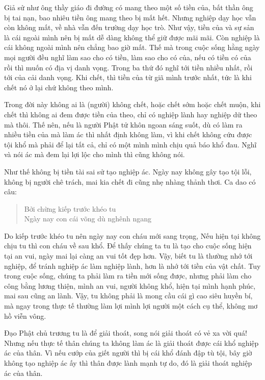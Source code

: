 \documentclass[
  12pt,
  oneside]{book}
\begin{document}
Giả sử như ông thầy giáo đi đường có mang theo một số tiền của, bất thần ông bị tai nạn, bao nhiêu tiền ông mang theo bị mất hết. Nhưng nghiệp dạy học vẫn còn không mất, về nhà vẫn đến trường dạy học trò. Như vậy, tiền của và sự sản là cái ngoài mình nên bị mất dễ dàng không thể giữ được mãi mãi. Còn nghiệp là cái không ngoài mình nên chẳng bao giờ mất. Thế mà trong cuộc sống hằng ngày mọi người đều nghĩ làm sao cho có tiền, làm sao cho có của, nếu có tiền có của rồi thì muốn có địa vị danh vọng. Trong ba thứ đó nghĩ tới tiền nhiều nhất, rồi tới của cải danh vọng. Khi chết, thì tiền của từ giã mình trước nhất, tức là khi chết nó ở lại chứ không theo mình.

Trong đời này không ai là (người) không chết, hoặc chết sớm hoặc chết muộn, khi chết thì không ai đem được tiền của theo, chỉ có nghiệp lành hay nghiệp dữ theo mà thôi. Thế nên, nếu là người Phật tử khôn ngoan sáng suốt, dù có làm ra nhiều tiền của mà làm ác thì nhất định không làm, vì khi chết không cứu được tội khổ mà phải để lại tất cả, chỉ có một mình mình chịu quả báo khổ đau. Nghĩ và nói ác mà đem lại lợi lộc cho mình thì cũng không nói.

Như thế không bị tiền tài sai sử tạo nghiệp ác. Ngày nay không gây tạo tội lỗi, không bị người chê trách, mai kia chết đi cũng nhẹ nhàng thảnh thơi. Ca dao có câu:

\begin{quote}
Bởi chừng kiếp trước khéo tu\\
Ngày nay con cái võng dù nghênh ngang
\end{quote}

Do kiếp trước khéo tu nên ngày nay con cháu mới sang trọng, Nếu hiện tại không chịu tu thì con cháu về sau khổ. Để thấy chúng ta tu là tạo cho cuộc sống hiện tại an vui, ngày mai lại càng an vui tốt đẹp hơn. Vậy, biết tu là thường nhớ tới nghiệp, để tránh nghiệp ác làm nghiệp lành, hơn là nhớ tới tiền của vật chất. Tuy trong cuộc sống, chúng ta phải làm ra tiền mới sống được, nhưng phải làm cho công bằng lương thiện, mình an vui, người không khổ, hiện tại mình hạnh phúc, mai sau cũng an lành. Vậy, tu không phải là mong cầu cái gì cao siêu huyền bí, mà ngay trong thực tế thường làm lợi mình lợi người một cách cụ thể, không mơ hồ viễn vông.

Đạo Phật chủ trương tu là để giải thoát, song nói giải thoát có vẻ xa vời quá! Nhưng nếu thực tế thân chúng ta không làm ác là giải thoát được cái khổ nghiệp ác của thân. Vì nếu cướp của giết người thì bị cái khổ đánh đập tù tội, bây giờ không tạo nghiệp ác ấy thì thân được lành mạnh tự do, đó là giải thoát nghiệp ác của thân.
\end{document}
